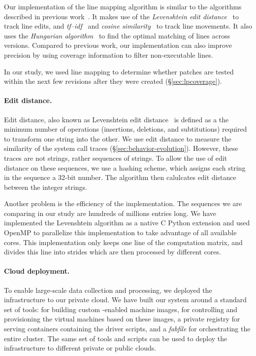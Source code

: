 Our implementation of the line mapping algorithm is similar to the
algorithms described in previous
work~\cite{szz:msr05,szz:ase06,change-source-code:msr07,szzrevisited:defects08}.
It makes use of the \emph{Levenshtein edit
  distance}~\cite{levenshtein1966binary} to track line edits, and
\emph{tf--idf}~\cite{tf-idf} and \emph{cosine
  similarity}~\cite{cosinesimilarity} to track line movements.  It
also uses the \emph{Hungarian algorithm}~\cite{hungarian} to find the
optimal matching of lines across versions.  Compared to previous work,
our implementation can also improve precision by using coverage information to filter
non-executable lines.


In our study, we used line mapping to determine whether patches are
tested within the next few revisions after they were created
(\S\ref{sec:lpcoverage}).

\paragraph{Edit distance.} Edit distance, also known as Levenshtein edit
distance~\cite{levenshtein1966binary} is defined as a the minimum number of
operations (insertions, deletions, and subtitutions) required to transform one
string into the other. We use edit distance to measure the similarity of the
system call traces (\S\ref{sec:behavior-evolution}). However, these traces are
not strings, rather sequences of strings. To allow the use of edit distance on
these sequences, we use a hashing scheme, which assigns each string in the
sequence a 32-bit number. The algorithm then calulcates edit distance between
the integer strings.

Another problem is the efficiency of the implementation. The sequences we are
comparing in our study are hundreds of millions entries long. We have
implemented the Levenshtein algorithm as a native C Python extension and used
OpenMP to parallelize this implementation to take advantage of all available
cores. This implementation only keeps one line of the computation matrix, and
divides this line into strides which are then processed by different cores.

\paragraph{Cloud deployment.} To enable large-scale data collection and
processing, we deployed the infrastructure to our private cloud. We have built
our system around a standard set of tools: \packer for building custom
\docker-enabled machine images, \vagrant for controlling and provisioning the
virtual machines based on these images, a private \docker registry for serving
\docker containers containing the driver scripts, and a {\em fabfile} for
orchestrating the entire cluster. The same set of tools and scripts can be used
to deploy the infrastructure to different private or public clouds.

